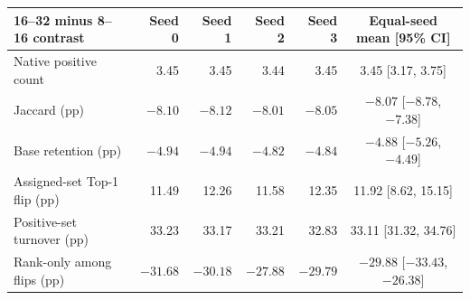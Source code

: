 \begin{tabular}{@{}lrrrrc@{}}
\toprule
16--32 minus 8--16 contrast & Seed 0 & Seed 1 & Seed 2 & Seed 3 & Equal-seed mean [95\% CI] \\
\midrule
Native positive count & 3.45 & 3.45 & 3.44 & 3.45 & 3.45 [3.17, 3.75] \\
Jaccard (pp) & $-8.10$ & $-8.12$ & $-8.01$ & $-8.05$ & $-8.07$ [$-8.78$, $-7.38$] \\
Base retention (pp) & $-4.94$ & $-4.94$ & $-4.82$ & $-4.84$ & $-4.88$ [$-5.26$, $-4.49$] \\
Assigned-set Top-1 flip (pp) & 11.49 & 12.26 & 11.58 & 12.35 & 11.92 [8.62, 15.15] \\
Positive-set turnover (pp) & 33.23 & 33.17 & 33.21 & 32.83 & 33.11 [31.32, 34.76] \\
Rank-only among flips (pp) & $-31.68$ & $-30.18$ & $-27.88$ & $-29.79$ & $-29.88$ [$-33.43$, $-26.38$] \\
\bottomrule
\end{tabular}
